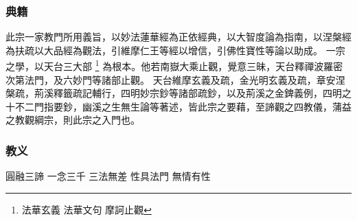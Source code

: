 \subsubsection{典籍}
此宗一家教門所用義旨，以妙法蓮華經為正依經典，以大智度論為指南，以涅槃經為扶疏以大品經為觀法，引維摩仁王等經以增信，引佛性寶性等論以助成。
一宗之學，以天台三大部
\footnote{法華玄義 法華文句 摩訶止觀}
為根本。他若南嶽大乘止觀，覺意三昧，天台釋禪波羅密次第法門，及六妙門等諸部止觀。
天台維摩玄義及疏，金光明玄義及疏，章安涅槃疏，荊溪釋籤疏記輔行，四明妙宗鈔等諸部疏鈔，以及荊溪之金錍義例，四明之十不二門指要鈔，幽溪之生無生論等著述，皆此宗之要藉，至諦觀之四教儀，蒲益之教觀綱宗，則此宗之入門也。

\subsubsection{教义}
圓融三諦
一念三千
三法無差
性具法門
無情有性
